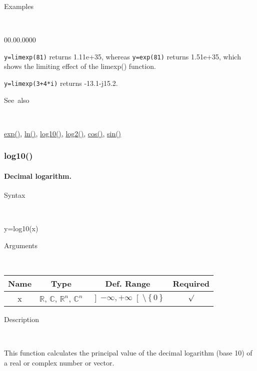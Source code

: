 \begin{description}
\item [Examples]~
\end{description}
\begin{lyxlist}{00.00.0000}
\item [\texttt{y=limexp(81)}]returns 1.11e+35, whereas \texttt{y=exp(81)} returns 1.51e+35,
which shows the limiting effect of the \textrm{limexp}() function.
\item [\texttt{y=limexp(3+4{*}i)}]returns -13.1-j15.2.
\end{lyxlist}
\begin{description}
\item [See~also]~
\end{description}
\textcolor{blue}{\hyperlink{exp}{exp()}}\textcolor{black}{,} 
\textcolor{blue}{\hyperlink{ln}{ln()}}\textcolor{black}{,} \textcolor{blue}{\hyperlink{log10}{log10()}}\textcolor{black}{,}
\textcolor{blue}{\hyperlink{log2}{log2()}}\textcolor{black}{,} \textcolor{blue}{\hyperlink{cos}{cos()}}\textcolor{black}{,}
\textcolor{blue}{\hyperlink{sin}{sin()}}


\newpage
\subsubsection*{\hypertarget{log10}{}{\Large log10()}}


\paragraph{\label{par:Decimal-logarithm}Decimal logarithm.}

\begin{description}
\item [Syntax]~
\end{description}
y=log10(x)

\begin{description}
\item [Arguments]~
\end{description}
\begin{tabular}{|c|c|c|c|}
\hline 
Name&
Type&
Def. Range&
Required\tabularnewline
\hline
\hline 
x&
$\mathbb{R}$, $\mathbb{C}$, $\mathbb{R}^{n}$, $\mathbb{C}^{n}$&
$\left]-\infty,+\infty\right[\setminus\left\{ 0\right\} $&
$\surd$\tabularnewline
\hline
\end{tabular}

\begin{description}
\item [Description]~
\end{description}
This function calculates the principal value of the decimal logarithm
(base 10) of a real or complex number or vector.

